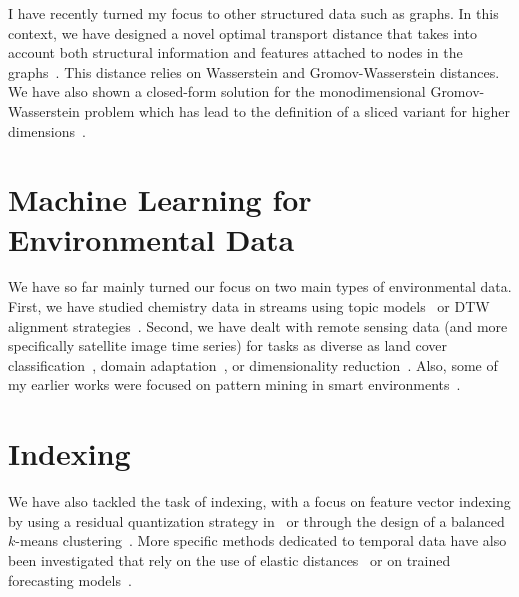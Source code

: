 I have recently turned my focus to other structured data such as graphs.
In this context, we have designed a novel optimal transport distance that takes into account both structural information and features attached to nodes in the graphs~\cite{vayer:hal-02174316,vayer:hal-02174322}.
This distance relies on Wasserstein and Gromov-Wasserstein distances.
We have also shown a closed-form solution for the monodimensional Gromov-Wasserstein problem which has lead to the definition of a sliced variant for higher dimensions~\cite{vayer:hal-02174309}.

\section*{Machine Learning for Environmental Data}

We have so far mainly turned our focus on two main types of environmental data.
First, we have studied chemistry data in streams using topic models~\cite{aubert:halshs-00906292} or DTW alignment strategies~\cite{dupas:halshs-01228397}.
Second, we have dealt with remote sensing data (and more specifically satellite image time series) for tasks as diverse as land cover classification~\cite{bailly:halshs-01343211,ruwurm:hal-02343851}, domain adaptation~\cite{bailly:halshs-01515283}, or dimensionality reduction~\cite{damodaran:hal-01620604}.
Also, some of my earlier works were focused on pattern mining in smart environments~\cite{tavenard:halshs-01138512,pauwels:halshs-01138508,salah:halshs-01138500}.

\section*{Indexing}

We have also tackled the task of indexing, with a focus on feature vector indexing by using a residual quantization strategy in~\cite{jegou:inria-00566883} or through the design of a balanced $k$-means clustering~\cite{tavenard:inria-00576886}.
More specific methods dedicated to temporal data have also been investigated that rely on the use of elastic distances~\cite{carlinisperandio:hal-01841995,tavenard:hal-00862176} or on trained forecasting models~\cite{tavenard:inria-00567877}.

